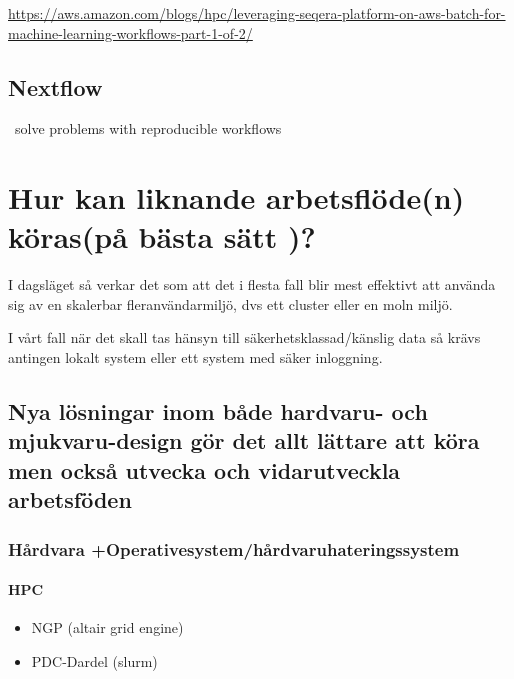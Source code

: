 \documentclass[
  letterpaper,
  DIV=11,
  numbers=noendperiod]{scrreprt}
\begin{document}
\url{https://aws.amazon.com/blogs/hpc/leveraging-seqera-platform-on-aws-batch-for-machine-learning-workflows-part-1-of-2/}

\section{Nextflow}\label{nextflow}

~solve problems with reproducible workflows


\chapter{Hur kan liknande arbetsflöde(n) köras(på bästa sätt
)?}\label{hur-kan-liknande-arbetsfluxf6den-kuxf6raspuxe5-buxe4sta-suxe4tt}

I dagsläget så verkar det som att det i flesta fall blir mest effektivt
att använda sig av en skalerbar fleranvändarmiljö, dvs ett cluster eller
en moln miljö.

I vårt fall när det skall tas hänsyn till säkerhetsklassad/känslig data
så krävs antingen lokalt system eller ett system med säker inloggning.

\section{Nya lösningar inom både hardvaru- och mjukvaru-design gör det
allt lättare att köra men också utvecka och vidarutveckla
arbetsföden}\label{nya-luxf6sningar-inom-buxe5de-hardvaru--och-mjukvaru-design-guxf6r-det-allt-luxe4ttare-att-kuxf6ra-men-ocksuxe5-utvecka-och-vidarutveckla-arbetsfuxf6den}

\subsection{Hårdvara
+Operativesystem/hårdvaruhateringssystem}\label{huxe5rdvara-operativesystemhuxe5rdvaruhateringssystem}

\subsubsection{HPC}\label{hpc}

\begin{itemize}
\item
  NGP (altair grid engine)
\item
  PDC-Dardel (slurm)
\end{itemize}
\end{document}
